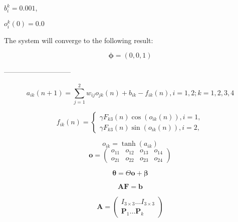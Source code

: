 \documentclass{article}
\renewcommand{\vec}[1]{\mathbf{#1}}
\begin{document}
$b_{i}^{k}=0.001$,

$o_{i}^{k}(0)=0.0$

The system will converge to the following result:

\begin{equation}
    \vec{\phi}=(0,0,1)
    \label{<+label+>}
\end{equation}





-----------------------------


\begin{equation}
    a_{ik}(n+1)=\sum_{j=1}^{2} w_{ij}o_{jk}(n)+b_{ik}-f_{ik}(n), i=1,2; k=1,2,3,4 
    \label{<+label+>}
\end{equation}

\begin{equation}
    f_{ik}(n)=\left\{
        \begin{array}{rcl}
            \gamma F_{k3}(n) \cos(o_{ik}(n)), i=1,\\
            \gamma F_{k3}(n) \sin(o_{ik}(n)), i=2,
        \end{array}
    \right.
    \label{equ:2}
\end{equation}


\begin{equation}
    o_{ik}=\tanh(a_{ik})
    \label{<+label+>}
\end{equation}
\begin{equation}
\vec{o} = 
    \begin{pmatrix}
        o_{11} & o_{12} & o_{13} & o_{14} \\
        o_{21} & o_{22} & o_{23} & o_{24}
    \end{pmatrix}
    \label{<+label+>}
\end{equation}

\begin{equation}
    \mathbf{\vec{\theta}}=\Theta \vec{o} + \mathbf{\beta}
\end{equation}

\begin{equation}
    \vec{A}\vec{F}=\vec{b}
    \label{<+label+>}
\end{equation}

\begin{equation}
        \vec{A}=
        \begin{pmatrix}
            I_{3 \times 3} \dots I_{3 \times 3} \\
            \vec{P}_{1} \dots \vec{P}_{k}
        \end{pmatrix}
    \label{<+label+>}
\end{equation}
\end{document}
